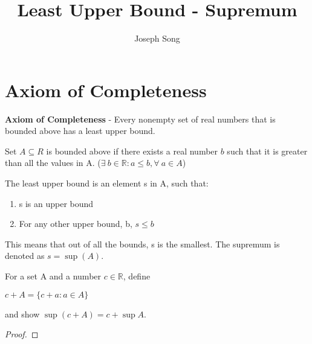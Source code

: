 \documentclass{article}
\title{Least Upper Bound - Supremum}
\author{Joseph Song}
\date{}
\begin{document}
\maketitle

\section{Axiom of Completeness}
\textbf{Axiom of Completeness} - Every nonempty set of real numbers that is bounded above has a least upper bound.
\begin{definition}
    Set $A \subseteq R$ is bounded above if there exists a real number $b$ such that it is greater than all the values in A. ($\exists\ b \in \mathbb{R}: a \leq b, \forall\ a\in A$)
\end{definition}

\begin{definition}
    The least upper bound is an element s in A, such that:
    \begin{enumerate}
        \item s is an upper bound
        \item For any other upper bound, b, $s \leq b$
    \end{enumerate}
    This means that out of all the bounds, s is the smallest. The supremum is denoted as $s = \operatorname{sup}(A)$.
\end{definition}

\begin{example}
    For a set A and a number $c \in \mathbb{R}$, define
    \begin{center}
        $c + A = \{c + a : a \in A\}$
    \end{center}
    and show $\operatorname{sup}(c+A) = c+\operatorname{sup}A$.
\end{example}
\begin{proof}
    
\end{proof}
\end{document}
